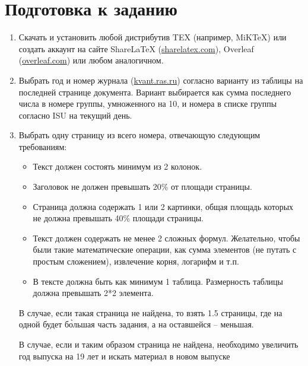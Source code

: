 \tableofcontents

\clearpage

\section{Подготовка к заданию}

\begin{enumerate}
    \item Скачать и установить любой дистрибутив TEX (например, MiKTeX) или создать аккаунт на сайте ShareLaTeX (\url{sharelatex.com}), Overleaf (\url{overleaf.com}) или любом аналогичном.
    
    \item Выбрать год и номер журнала  (\url{kvant.ras.ru}) согласно варианту из таблицы на последней странице документа. Вариант выбирается как сумма последнего числа в номере группы, умноженного на 10, и номера в списке группы согласно ISU на текущий день.
    
    \item Выбрать одну страницу из всего номера, отвечающую следующим требованиям:
        \begin{itemize}
            \item Текст должен состоять минимум из 2 колонок.
            
            \item Заголовок не должен превышать 20\% от площади страницы.
            
            \item Страница должна содержать 1 или 2 картинки, общая площадь которых не должна превышать 40\% площади страницы.
            
            \item Текст должен содержать не менее 2 сложных формул. Желательно, чтобы были такие математические операции, как сумма элементов (не путать с простым сложением), извлечение корня, логарифм и т.п.
            
            \item В тексте должна быть как минимум 1 таблица. Размерность таблицы должна превышать 2*2 элемента.
        \end{itemize}
        В случае, если такая страница не найдена, то взять 1.5 страницы, где на одной будет б\`{о}льшая часть задания, а на оставшейся – меньшая. 
        
        В случае, если и таким образом страница не найдена, необходимо увеличить год выпуска на 19 лет и искать материал в новом выпуске
\end{enumerate} 

